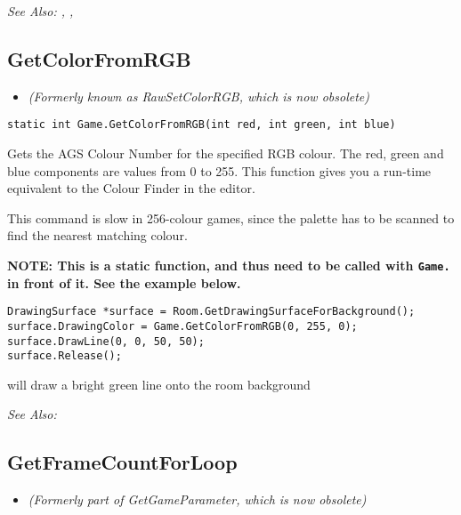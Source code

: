 \it{See Also:} ,
,


\subsection{GetColorFromRGB}\label{Game.GetColorFromRGB}%

\begin{itemize}
\item \it{(Formerly known as RawSetColorRGB, which is now obsolete)}
\end{itemize}

\begin{verbatim}
static int Game.GetColorFromRGB(int red, int green, int blue)
\end{verbatim}
Gets the AGS Colour Number for the specified RGB colour. The red, green and blue
components are values from 0 to 255. This function gives you a run-time equivalent
to the Colour Finder in the editor.

This command is slow in 256-colour games, since the palette has to be scanned to find the
nearest matching colour.

\bf{NOTE:} This is a static function, and thus need to be called with \verb$Game.$ in front of it. See
the example below.

\begin{verbatim}
DrawingSurface *surface = Room.GetDrawingSurfaceForBackground();
surface.DrawingColor = Game.GetColorFromRGB(0, 255, 0);
surface.DrawLine(0, 0, 50, 50);
surface.Release();
\end{verbatim}
will draw a bright green line onto the room background

\it{See Also:} 


\subsection{GetFrameCountForLoop}\label{Game.GetFrameCountForLoop}%

\begin{itemize}
\item \it{(Formerly part of GetGameParameter, which is now obsolete)}
\end{itemize}

